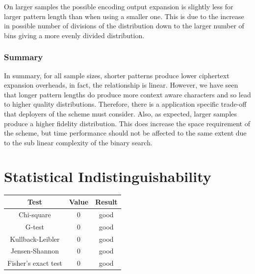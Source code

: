 \documentclass[ %
                    author={Samuel Russell},
                supervisor={Prof. Bogdan Warinschi},
                    degree={MEng},
                     title={Innocuous Ciphertexts},
                  subtitle={The DE-CENSOR Scheme},
                      type={research},
                      year={2018} ]{dissertation}
\begin{document}
On larger samples the possible encoding output expansion is slightly less for larger pattern length than when using a smaller one. This is due to the increase in possible number of divisions of the distribution down to the larger number of bins giving a more evenly divided distribution.

\subsubsection{Summary}

In summary, for all sample sizes, shorter patterns produce lower ciphertext expansion overheads, in fact, the relationship is linear.
However, we have seen that longer pattern lengths do produce more context aware characters and so lead to higher quality distributions.
Therefore, there is a application specific trade-off that deployers of the scheme must consider.
Also, as expected, larger samples produce a higher fidelity distribution.
This does increase the space requirement of the scheme, but time performance should not be affected to the same extent due to the sub linear complexity of the binary search.

\section{Statistical Indistinguishability}

\begin{table}[h]
\centering
\begin{tabular}{|c|c|c|}

\hline

Test					& Value		& Result\\

\hline

Chi-square				& 0			& good\\

G-test					& 0			& good\\

Kullback-Leibler		& 0			& good\\

Jensen-Shannon			& 0			& good\\

Fisher's exact test		& 0			& good\\

\hline

\end{tabular}

\end{table}
\end{document}
